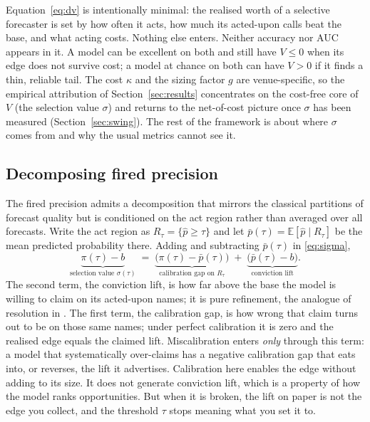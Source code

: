 \documentclass{sbc2023}%
\theoremstyle{definition}
\theoremstyle{plain}
\newcommand{\Pup}{\hat p}
\begin{document}
Equation~\eqref{eq:dv} is intentionally minimal: the realised worth of a selective
forecaster is set by how often it acts, how much its acted-upon calls beat the base,
and what acting costs. Nothing else enters. Neither accuracy nor AUC appears in it.
A model can be excellent on both and still have $V\le 0$ when its edge does not
survive cost; a model at chance on both can have $V>0$ if it finds a thin, reliable
tail. The cost $\kappa$ and the sizing factor $g$ are venue-specific, so the
empirical attribution of Section~\ref{sec:results} concentrates on the cost-free core
of $V$ (the selection value $\sigma$) and returns to the net-of-cost picture once
$\sigma$ has been measured (Section~\ref{sec:swing}). The rest of the framework is
about where $\sigma$ comes from and why the usual metrics cannot see it.

\subsection{Decomposing fired precision}
\label{sec:decomp}
The fired precision admits a decomposition that mirrors the classical partitions of
forecast quality but is conditioned on the act region rather than averaged over all
forecasts. Write the act region as $R_\tau=\{\Pup\ge\tau\}$ and let
$\bar p(\tau)=\mathbb E[\Pup\mid R_\tau]$ be the mean predicted probability there.
Adding and subtracting $\bar p(\tau)$ in \eqref{eq:sigma},
\begin{equation}
\label{eq:partition}
\underbrace{\pi(\tau)-b}_{\text{selection value }\sigma(\tau)}
\;=\;
\underbrace{\big(\pi(\tau)-\bar p(\tau)\big)}_{\text{calibration gap on }R_\tau}
\;+\;
\underbrace{\big(\bar p(\tau)-b\big)}_{\text{conviction lift}} .
\end{equation}
The second term, the conviction lift, is how far above the base the model is willing
to claim on its acted-upon names; it is pure refinement, the analogue of resolution
in \citep{murphy1973}. The first term, the calibration gap, is how wrong that claim turns
out to be on those same names; under perfect calibration it is zero and the realised
edge equals the claimed lift. Miscalibration enters \emph{only} through this term: a
model that systematically over-claims has a negative calibration gap that eats into,
or reverses, the lift it advertises. Calibration here enables the edge without adding
to its size. It does not generate conviction lift, which is a property of how the
model ranks opportunities. But when it is broken, the lift on paper is not the edge
you collect, and the threshold $\tau$ stops meaning what you set it to.
\end{document}
